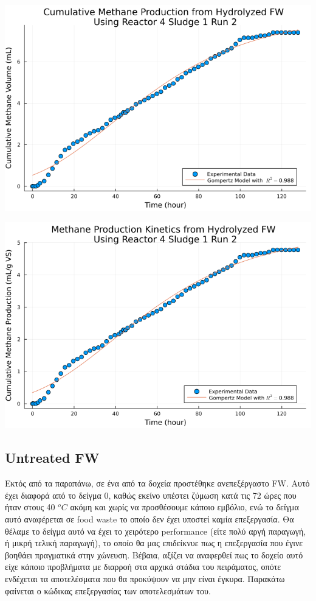 \documentclass[11pt]{article}
\begin{document}
\begin{center}
\includegraphics[width=.9\linewidth]{../plots/BMPs/Hydrolyzed FW/methane_kinetics_hydrolysate_4_s1_r2_hour.png}
\end{center}

\begin{center}
\includegraphics[width=.9\linewidth]{../plots/BMPs/Hydrolyzed FW/specific_methane_kinetics_hydrolysate_4_s1_r2_hour.png}
\end{center}

\subsection{Untreated FW}
\label{sec:org8ec09d3}
Εκτός από τα παραπάνω, σε ένα από τα δοχεία προστέθηκε ανεπεξέργαστο FW. Αυτό έχει διαφορά από το δείγμα 0, καθώς εκείνο υπέστει ζύμωση κατά τις 72 ώρες που ήταν στους 40 \(^oC\) ακόμη και χωρίς να προσθέσουμε κάποιο εμβόλιο, ενώ το δείγμα αυτό αναφέρεται σε food waste το οποίο δεν έχει υποστεί καμία επεξεργασία. Θα θέλαμε το δείγμα αυτό να έχει το χειρότερο performance (είτε πολύ αργή παραγωγή, ή μικρή τελική παραγωγή), το οποίο θα μας επιδείκνυε πως η επεξεργασία που έγινε βοηθάει πραγματικά στην χώνευση. Βέβαια, αξίζει να αναφερθεί πως το δοχείο αυτό είχε κάποιο προβλήματα με διαρροή στα αρχικά στάδια του πειράματος, οπότε ενδέχεται τα αποτελέσματα που θα προκύψουν να μην είναι έγκυρα. Παρακάτω φαίνεται ο κώδικας επεξεργασίας των αποτελεσμάτων του.
\end{document}
